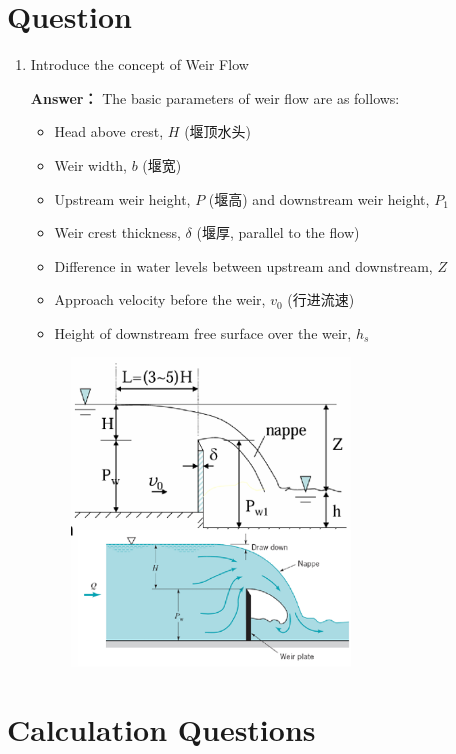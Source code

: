 \documentclass[12pt,a4paper]{article}
\newcounter{question}
\newenvironment{questions}{
    \setcounter{question}{0}
    \section*{Question}
    \begin{enumerate}[leftmargin=1.5em,label={\arabic*．}]
}{
    \end{enumerate}
}
\newcommand{\answer}[1]{\par\noindent\textbf{Answer：} #1\par\vspace{1em}}
\begin{document}
\begin{questions}
\item Introduce the concept of Weir Flow

\answer{
  The basic parameters of weir flow are as follows:
  \begin{itemize}
    \item Head above crest, $H$ (堰顶水头)
    \item Weir width, $b$ (堰宽)
    \item Upstream weir height, $P$ (堰高) and downstream weir height, $P_1$
    \item Weir crest thickness, $\delta$ (堰厚, parallel to the flow)
    \item Difference in water levels between upstream and downstream, $Z$
    \item Approach velocity before the weir, $v_0$ (行进流速)
    \item Height of downstream free surface over the weir, $h_s$
  \end{itemize}
}

\begin{figure}[H]
\centering
\includegraphics[width=0.7\textwidth]{./figures/33.png}
\end{figure}


\end{questions}

\newpage

\section{Calculation Questions}
\end{document}
